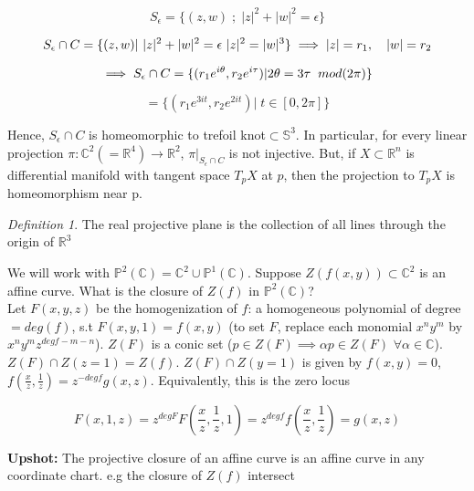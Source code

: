 \documentclass[12pt]{article}
\theoremstyle{remark}
\newtheorem{definition}[theorem]{Definition}
\begin{document}
\[
    S_{\epsilon}=\{(z,w)\; ; \; |z|^2+|w|^2=\epsilon \}
\] 

\[
    S_{\epsilon}\cap C = \{(z,w)|\text{ }|z|^2+|w|^2=\epsilon \text{ }|z|^2=|w|^3\} \implies |z|=r_1,\quad|w|=r_2\\ \\
\]

\[
    \implies  S_{\epsilon}\cap C  = \{(r_1 e^{i\theta}, r_2e^{i\tau})|2\theta=3\tau \; \; mod (2\pi )\} \\
\]

\[
   = \{(r_1 e^{3it}, r_2e^{2it})| \; t \in [0,2\pi] \}
\]

Hence, $ S_{\epsilon}\cap C$ is homeomorphic to trefoil knot$\subset \mathbb{S}^3$. In particular, for every linear projection $\pi:\mathbb{C}^2(=\mathbb{R}^4)\rightarrow \mathbb{R}^2$, $\pi|_{S_{\epsilon}\cap C}$ is not injective. But, if $X\subset \mathbb{R}^n$ is differential manifold with tangent space $T_p X$ at $p$, then the projection to $T_p X $ is homeomorphism near p.\\

\begin{definition}

The real projective plane is the collection of all lines through the origin of $\mathbb{R}^3$

\end{definition}

We will work with $\mathbb{P}^2(\mathbb{C})=\mathbb{C}^2\cup \mathbb{P}^1(\mathbb{C})$. Suppose $Z(f(x,y))\subset \mathbb{C}^2$ is an affine curve. What is the closure of $Z(f)$ in $\mathbb{P}^2(\mathbb{C})$?\\

 Let $F(x,y,z)$ be the homogenization of $f$: a homogeneous polynomial of degree$=deg(f)$, s.t $F(x,y,1)=f(x,y)$ (to set $F$, replace each monomial $x^n y^m$ by $x^n y^m z^{deg f -m-n}$). $Z(F)$ is a conic set ($p\in Z(F)\implies \alpha p\in Z(F)$ $\forall \alpha \in \mathbb{C}$).\\

 $Z(F)\cap Z(z=1)= Z(f)$. $Z(F)\cap Z(y=1)$ is given by $f(x,y)=0$, $f(\frac{x}{z},\frac{1}{z})=z^{-deg f}g(x,z)$. Equivalently, this is the zero locus

\[
    F(x,1,z)=z^{deg F}F(\frac{x}{z},\frac{1}{z},1)=z^{deg f}f(\frac{x}{z},\frac{1}{z})=g(x,z) 
\]

\textbf{Upshot:} The projective closure of an affine curve is an affine curve in any coordinate chart. e.g the closure  of $Z(f)$ intersect
\end{document}
